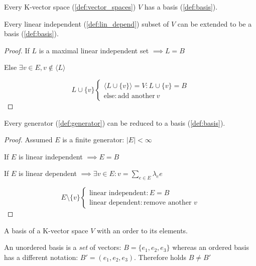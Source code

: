 \begin{corollary} %
   Every K-vector space (\ref{def:vector_spaces}) \(V\) has a basis (\ref{def:basis}).
\end{corollary}

\begin{corollary}
   Every linear independent (\ref{def:lin_depend}) subset of \(V\) can be extended to be a basis (\ref{def:basis}).
\end{corollary}
\begin{proof}
   If \(L\) is a maximal linear independent set \(\implies L = B\)

   Else \(\exists v \in E, v \notin \langle L \rangle\)

   \[L \cup \{v\} \begin{cases}\langle L \cup \{v\} \rangle = V: L \cup \{v\} = B\\ \text{else}: \text{add another}~v\end{cases}\]
\end{proof}

\begin{corollary}
   Every generator (\ref{def:generator}) can be reduced to a basis (\ref{def:basis}).
\end{corollary}
\begin{proof}
   Assumed \(E\) is a finite generator: \(|E| < \infty\)

   If \(E\) is linear independent \(\implies E = B\)

   If \(E\) is linear dependent \(\implies \exists v \in E: v = \sum_{e \in E} \lambda_e e\)

   \[E \setminus \{v\} \begin{cases}\text{linear independent}: E = B\\ \text{linear dependent}: \text{remove another }v\end{cases}\]
\end{proof}

\begin{definition}
   A basis of a K-vector space \(V\) with an order to its elements.
\end{definition}
\begin{remark}
   An unordered basis is a \textit{set} of vectors: \(B = \{e_1, e_2, e_3\}\) whereas an ordered basis has a different notation: \(B' = (e_1, e_2, e_3)\).
   Therefore holds \(B \neq B'\)
\end{remark}

